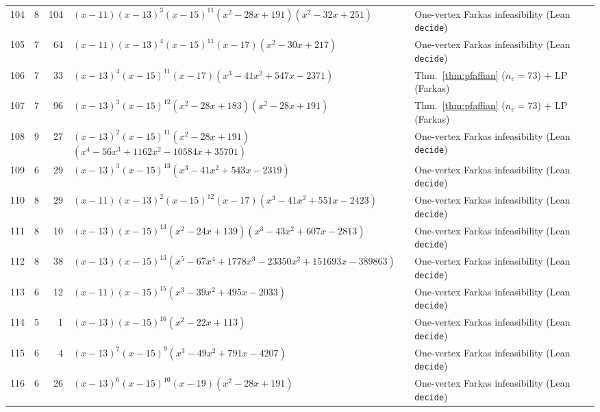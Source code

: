 \documentclass[11pt,reqno]{amsart}
\theoremstyle{definition}
\theoremstyle{remark}
\numberwithin{equation}{section}
\numberwithin{table}{section}
\begin{document}
{\begin{longtable}{@{}rrr>{\raggedright\arraybackslash}p{2.50in}>{\raggedright\arraybackslash}p{2.30in}@{}}
104 & 8 & 104 & $(x-11)$\allowbreak $(x-13)^3$\allowbreak $(x-15)^{11}$\allowbreak $(x^2-28x+191)$\allowbreak $(x^2-32x+251)$ & One-vertex Farkas infeasibility (Lean \texttt{decide}) \\
105 & 7 & 64 & $(x-11)$\allowbreak $(x-13)^4$\allowbreak $(x-15)^{11}$\allowbreak $(x-17)$\allowbreak $(x^2-30x+217)$ & One-vertex Farkas infeasibility (Lean \texttt{decide}) \\
106 & 7 & 33 & $(x-13)^4$\allowbreak $(x-15)^{11}$\allowbreak $(x-17)$\allowbreak $(x^3-41x^2+547x-2371)$ & Thm.~\ref{thm:pfaffian} ($n_v=73$) + LP (Farkas) \\
107 & 7 & 96 & $(x-13)^3$\allowbreak $(x-15)^{12}$\allowbreak $(x^2-28x+183)$\allowbreak $(x^2-28x+191)$ & Thm.~\ref{thm:pfaffian} ($n_v=73$) + LP (Farkas) \\
108 & 9 & 27 & $(x-13)^2$\allowbreak $(x-15)^{11}$\allowbreak $(x^2-28x+191)$\allowbreak $(x^4-56x^3+1162x^2-10584x+35701)$ & One-vertex Farkas infeasibility (Lean \texttt{decide}) \\
109 & 6 & 29 & $(x-13)^3$\allowbreak $(x-15)^{13}$\allowbreak $(x^3-41x^2+543x-2319)$ & One-vertex Farkas infeasibility (Lean \texttt{decide}) \\
110 & 8 & 29 & $(x-11)$\allowbreak $(x-13)^2$\allowbreak $(x-15)^{12}$\allowbreak $(x-17)$\allowbreak $(x^3-41x^2+551x-2423)$ & One-vertex Farkas infeasibility (Lean \texttt{decide}) \\
111 & 8 & 10 & $(x-13)$\allowbreak $(x-15)^{13}$\allowbreak $(x^2-24x+139)$\allowbreak $(x^3-43x^2+607x-2813)$ & One-vertex Farkas infeasibility (Lean \texttt{decide}) \\
112 & 8 & 38 & $(x-13)$\allowbreak $(x-15)^{13}$\allowbreak $(x^5-67x^4+1778x^3-23350x^2+151693x-389863)$ & One-vertex Farkas infeasibility (Lean \texttt{decide}) \\
113 & 6 & 12 & $(x-11)$\allowbreak $(x-15)^{15}$\allowbreak $(x^3-39x^2+495x-2033)$ & One-vertex Farkas infeasibility (Lean \texttt{decide}) \\
114 & 5 & 1 & $(x-13)$\allowbreak $(x-15)^{16}$\allowbreak $(x^2-22x+113)$ & One-vertex Farkas infeasibility (Lean \texttt{decide}) \\
115 & 6 & 4 & $(x-13)^7$\allowbreak $(x-15)^9$\allowbreak $(x^3-49x^2+791x-4207)$ & One-vertex Farkas infeasibility (Lean \texttt{decide}) \\
116 & 6 & 26 & $(x-13)^6$\allowbreak $(x-15)^{10}$\allowbreak $(x-19)$\allowbreak $(x^2-28x+191)$ & One-vertex Farkas infeasibility (Lean \texttt{decide}) \\

\end{longtable}}
\end{document}
